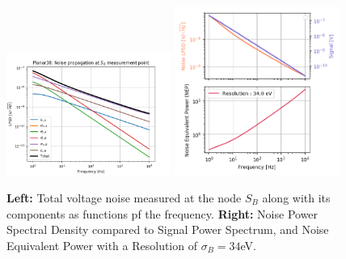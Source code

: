 \begin{figure}
\centering
\includegraphics[width=0.48\textwidth]{Figures/Electrodes/planar38_noise_propagation.png}
\includegraphics[width=0.48\textwidth]{Figures/Electrodes/planar38_nep_resolution.png}
\caption{
\textbf{Left:} Total voltage noise measured at the node $S_B$ along with its components as functions pf the frequency.
\textbf{Right:} Noise Power Spectral Density compared to Signal Power Spectrum, and Noise Equivalent Power with a Resolution of $\sigma_{B} = 34$eV.
}
\label{fig:planar38-propagation}
\end{figure}

